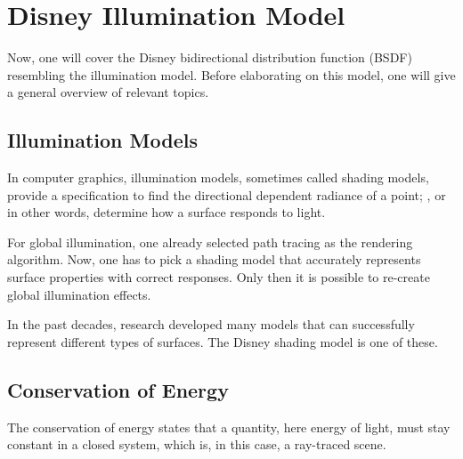

\section{Disney Illumination Model} \label{sec:disney-illumination-model}

Now, one will cover the Disney bidirectional distribution function (BSDF) resembling the illumination model.
Before elaborating on this model, one will give a general overview of relevant topics.

\subsection*{Illumination Models}

In computer graphics, illumination models, sometimes called shading models, provide a specification to find the directional dependent radiance of a point; \cite{duin_beleuchtungsalgorithmen_1993}, or in other words, determine how a surface responds to light.

For global illumination, one already selected path tracing as the rendering algorithm.
Now, one has to pick a shading model that accurately represents surface properties with correct responses.
Only then it is possible to re-create global illumination effects.

In the past decades, research developed many models that can successfully represent different types of surfaces.
The Disney shading model is one of these.

\subsection*{Conservation of Energy}

The conservation of energy states that a quantity, here energy of light, must stay constant in a closed system, which is, in this case, a ray-traced scene.

